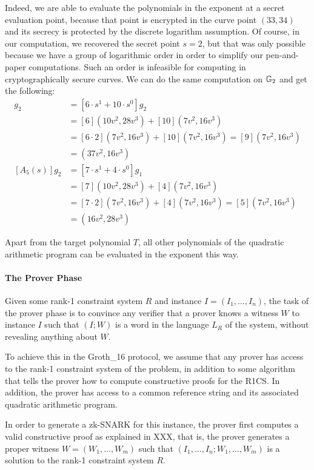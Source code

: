 \begin{example}
Indeed, we are able to evaluate the polynomials in the exponent at a secret evaluation point, because that point is encrypted in the curve point $(33,34)$ and its secrecy is protected by the discrete logarithm assumption. Of course, in our computation, we recovered the secret point $s=2$, but that was only possible because we have a group of logarithmic order in order to simplify our pen-and-paper computations. Such an order is infeasible for computing in cryptographically secure curves. We can do the same computation on $\mathbb{G}_2$ and get the following:
\begin{align*}
[A_2(s)]g_2 & = [6\cdot s^1 + 10\cdot s^0] g_2 \\
     & = [6](10v^2,28v^3) + [10](7v^2,16v^3) \\
     & = [6\cdot 2](7v^2,16v^3) + [10](7v^2,16v^3) = [9](7v^2,16v^3) \\   
     & = (37v^2,16v^3)\\
[A_5(s)]g_2 & = [7\cdot s^1 + 4\cdot s^0] g_1 \\
     & = [7](10v^2,28v^3) + [4](7v^2,16v^3) \\
     & = [7\cdot 2](7v^2,16v^3) + [4](7v^2,16v^3) = [5](7v^2,16v^3)\\
     & = (16v^2,28v^3)     
\end{align*}

Apart from the target polynomial $T$, all other polynomials of the quadratic arithmetic program can be evaluated in the exponent this way.
\end{example}
\paragraph{The Prover Phase} Given some rank-1 constraint system $R$ and instance $I=(I_1,\ldots, I_n)$, the task of the prover phase is to convince any verifier that a prover knows a witness $W$ to instance $I$ such that  $(I;W)$ is a word in the language $L_R$ of the system, without revealing anything about $W$. 

To achieve this in the Groth\_16 protocol, we assume that any prover has access to the rank-1 constraint system of the problem, in addition to some algorithm that tells the prover how to compute constructive proofs for the R1CS. In addition, the prover has access to a common reference string and its associated quadratic arithmetic program. 

In order to generate a zk-SNARK for this instance, the prover first computes a valid constructive proof as explained in XXX, that is, the prover generates a proper witness $W= (W_1,\ldots,W_m)$ such that  $(I_1,\ldots, I_n; W_1,\ldots,W_m)$ is a solution to the rank-1 constraint system $R$. 

